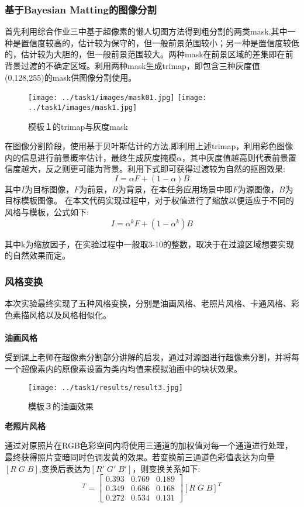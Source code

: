 \documentclass[UTF8]{ctexart}
\begin{document}
\subsubsection{基于Bayesian Matting的图像分割}
首先利用综合作业三中基于超像素的懒人切图方法得到粗分割的两类mask,其中一种是置信度较高的，估计较为保守的，但一般前景范围较小；另一种是置信度较低的，估计较为大胆的，但一般前景范围较大。两种mask在前景区域的差集即在前背景过渡的不确定区域。利用两种mask生成trimap，即包含三种灰度值(0,128,255)的mask供图像分割使用。
\begin{figure}[H]
    \centering
    \texttt{[image: ../task1/images/mask01.jpg]}
    \texttt{[image: ../task1/images/mask1.jpg]}
    \caption{模板１的trimap与灰度mask}
\end{figure}

在图像分割阶段，使用基于贝叶斯估计的方法\cite{ref1},即利用上述trimap，利用彩色图像内的信息进行前景概率估计，最终生成灰度掩模$\alpha$，其中灰度值越高则代表前景置信度越大，反之则更可能为背景。利用下式即可获得过渡较为自然的抠图效果:
\begin{equation}
    I = \alpha F + (1-\alpha)B
\end{equation}
其中$I$为目标图像，$F$为前景，$B$为背景，在本任务应用场景中即$F$为源图像，$B$为目标模板图像。
在本文代码实现过程中，对于权值进行了缩放以便适应于不同的风格与模板，公式如下:
\begin{equation}
    I = \alpha^k F+(1-\alpha^k)B
\end{equation}

其中k为缩放因子，在实验过程中一般取3-10的整数，取决于在过渡区域想要实现的自然效果而定。

\subsubsection{风格变换}
本次实验最终实现了五种风格变换，分别是油画风格、老照片风格、卡通风格、彩色素描风格以及风格相似化。
\\\\
\textbf{油画风格}

受到课上老师在超像素分割部分讲解的启发，通过对源图进行超像素分割，并将每一个超像素内的原像素设置为类内均值来模拟油画中的块状效果。
\begin{figure}[H]
    \centering
    \texttt{[image: ../task1/results/result3.jpg]}
    \caption{模板３的油画效果}
\end{figure}


\noindent\textbf{老照片风格}

通过对原照片在RGB色彩空间内将使用三通道的加权值对每一个通道进行处理，最终获得照片变暗同时色调发黄的效果。若变换前三通道色彩值表达为向量$[R\;G\;B]$,变换后表达为$[R'\; G'\; B']$，则变换关系如下:
\begin{equation}
    [R'\;G'\; B']^T=\left[
    \begin{matrix}
        0.393 & 0.769 & 0.189\\
        0.349 & 0.686 & 0.168\\
        0.272 & 0.534 & 0.131
    \end{matrix}
    \right][R\;G\;B]^T
\end{equation}
\end{document}
